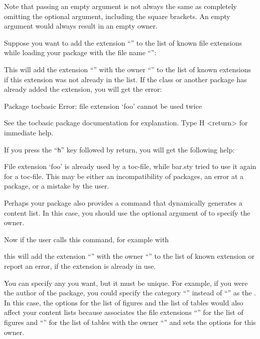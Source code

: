 Note that passing an empty  argument is not
always the same as completely omitting the optional argument, including the
square brackets. An empty argument would always result in an empty owner.
\begin{Example}
  Suppose you want to add the extension ``'' to the list of known
  file extensions while loading your package with the file name
  ``'':
\begin{lstcode}
\end{lstcode}%
  This will add the extension ``'' with the owner
  ``'' to the list of known extensions if this extension was
  not already in the list. If the class or another package has already added
  the extension, you will get the error:
\begin{lstoutput}
  Package tocbasic Error: file extension `foo' cannot be used twice

  See the tocbasic package documentation for explanation.
  Type  H <return>  for immediate help.
\end{lstoutput}
  If you press the ``\texttt{h}'' key followed by return, you will get the
  following help:
\begin{lstoutput}
  File extension `foo' is already used by a toc-file, while bar.sty
  tried to use it again for a toc-file.
  This may be either an incompatibility of packages, an error at a package,
  or a mistake by the user.
\end{lstoutput}

  Perhaps your package also provides a command that dynamically generates a
  content list. In this case, you should use the optional argument of
   to specify the owner.
\begin{lstcode}
  \newcommand*{\createnewlistofsomething}[1]{%
    \addtotoclist[bar.sty]{#1}%
  }
\end{lstcode}
  Now if the user calls this command, for example with
\begin{lstcode}
\end{lstcode}
  this will add the extension ``'' with the owner
  ``'' to the list of known extension or report an error, if
  the extension is already in use.
\end{Example}
You can specify any  you want, but it must be unique. For
example, if you were the author of the  package, you could
specify the category ``'' instead of ``'' as
the . In this case, the \KOMAScript{}
options%
 for the list of figures and the list of
tables would also affect your content lists because \KOMAScript{} associates
the file extensions ``'' for the list of figures and
``'' for the list of tables with the owner ``'' and
sets the options for this owner.

